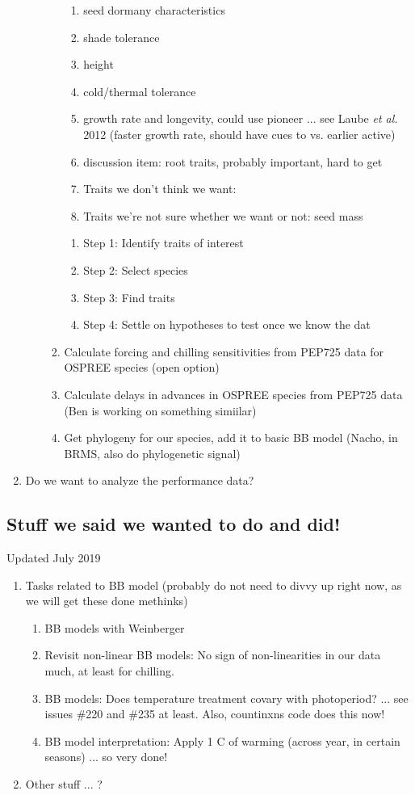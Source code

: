 \documentclass[11pt,letterpaper]{article}
\begin{document}
\begin{enumerate}
\begin{enumerate}
\begin{enumerate}
\begin{enumerate}
\item seed dormany characteristics
\item shade tolerance
\item height
\item cold/thermal tolerance 
\item growth rate and longevity, could use pioneer ... see Laube \emph{et al.} 2012 (faster growth rate, should have cues to vs. earlier active)
\item discussion item: root traits, probably important, hard to get
\item Traits we don't think we want: 
\item Traits we're not sure whether we want or not: seed mass
\end{enumerate}
\begin{enumerate}
\item Step 1: Identify traits of interest
\item Step 2: Select species
\item Step 3: Find traits
\item Step 4: Settle on hypotheses to test once we know the dat
\end{enumerate}
\item Calculate forcing and chilling sensitivities from PEP725 data for OSPREE species (open option)
\item Calculate delays in advances in OSPREE species from PEP725 data (Ben is working on something simiilar)
\item Get phylogeny for our species, add it to basic BB model (Nacho, in BRMS, also do phylogenetic signal)
\end{enumerate}
\end{enumerate}
\item Do we want to analyze the performance data? 
\end{enumerate} 

\subsection{Stuff we said we wanted to do and did!}
Updated July 2019
\begin{enumerate}

\item Tasks related to BB model (probably do not need to divvy up right now, as we will get these done methinks)
\begin{enumerate}
\item BB models with Weinberger
\item Revisit non-linear BB models: No sign of non-linearities in our data much, at least for chilling. 
\item BB models: Does temperature treatment covary with photoperiod? ... see issues \#220 and \#235 at least. Also, countinxns code does this now!
\item BB model interpretation: Apply 1 C of warming (across year, in certain seasons) ... so very done!
\end{enumerate}
\item Other stuff ... ?
\end{enumerate}
\end{document}
